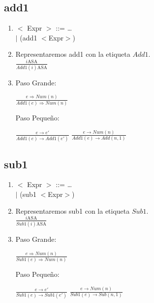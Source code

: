 \documentclass{article}
\begin{document}
\subsection*{add1}
\begin{enumerate}[label = (\alph*)]
    \item $<$ Expr $>$ ::= \ldots \\
          $|$ (add1 $<$Expr$>$)
    
    \item Representaremos add1 con la etiqueta $Add1$.\\
    $\frac{i\text{ASA}}{Add1(i)\text{ASA}}$
    
    \item Paso Grande: \begin{center}
        $\frac{e\Rightarrow Num(n)}{Add1(e)\Rightarrow Num(n)}$
    \end{center}
    
    Paso Pequeño: \begin{center}
        $\frac{e\rightarrow e'}{Add1(e)\rightarrow Add1(e')}$
        $\frac{e\rightarrow Num(n)}{Add1(e)\rightarrow Add(n,1)}$
    \end{center}
\end{enumerate}

\subsection*{sub1}
\begin{enumerate}[label = (\alph*)]
    \item $<$ Expr $>$ ::= \ldots \\
          $|$ (sub1 $<$Expr$>$)

    
    \item Representaremos sub1 con la etiqueta $Sub1$.\\
    $\frac{i\text{ASA}}{Sub1(i)\text{ASA}}$

    \item Paso Grande: \begin{center}
        $\frac{e\Rightarrow Num(n)}{Sub1(e)\Rightarrow Num(n)}$
    \end{center}
    
    Paso Pequeño: \begin{center}
        $\frac{e\rightarrow e'}{Sub1(e)\rightarrow Sub1(e')}$
        $\frac{e\rightarrow Num(n)}{Sub1(e)\rightarrow Sub(n,1)}$
    \end{center}
\end{enumerate}
\end{document}
